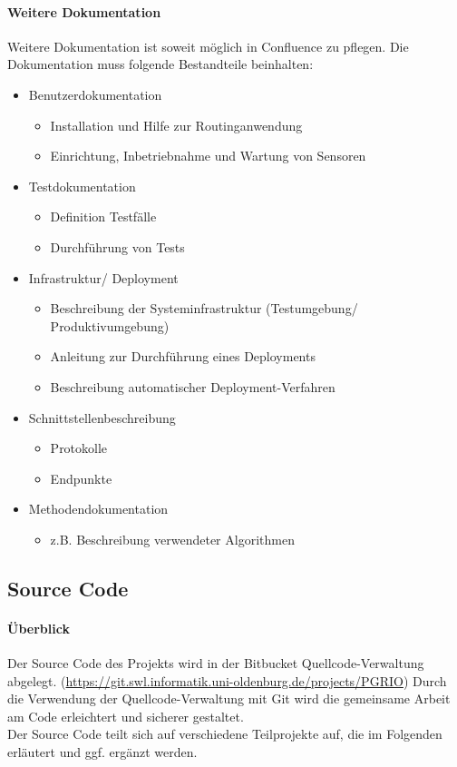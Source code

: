 \paragraph{Weitere Dokumentation}
Weitere Dokumentation ist soweit möglich in Confluence zu pflegen. Die Dokumentation muss folgende Bestandteile beinhalten:
\begin{itemize}
	\item Benutzerdokumentation
	\begin{itemize}
		\item Installation und Hilfe zur Routinganwendung
		\item Einrichtung, Inbetriebnahme und Wartung von Sensoren
	\end{itemize}
	\item Testdokumentation
	\begin{itemize}
		\item Definition Testfälle
		\item Durchführung von Tests
	\end{itemize}
	\item Infrastruktur/ Deployment
	\begin{itemize}
		\item Beschreibung der Systeminfrastruktur (Testumgebung/ Produktivumgebung)
		\item Anleitung zur Durchführung eines Deployments
		\item Beschreibung automatischer Deployment-Verfahren
	\end{itemize}
	\item Schnittstellenbeschreibung
	\begin{itemize}
		\item Protokolle
		\item Endpunkte
	\end{itemize}
	\item Methodendokumentation
	\begin{itemize}
		\item z.B. Beschreibung verwendeter Algorithmen
	\end{itemize}
\end{itemize}

\subsection{Source Code}
\paragraph{Überblick}
Der Source Code des Projekts wird in der Bitbucket Quellcode-Verwaltung abgelegt. (\url{https://git.swl.informatik.uni-oldenburg.de/projects/PGRIO}) Durch die Verwendung der Quellcode-Verwaltung mit Git wird die gemeinsame Arbeit am Code erleichtert und sicherer gestaltet.\\
Der Source Code teilt sich auf verschiedene Teilprojekte auf, die im Folgenden erläutert und ggf. ergänzt werden.

